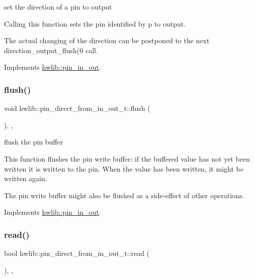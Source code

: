 set the direction of a pin to output

Calling this function sets the pin identified by p to output.

The actual changing of the direction can be postponed to the next direction\+\_\+output\+\_\+flush(0 call. 

Implements \hyperlink{classhwlib_1_1pin__in__out_ad08a5f5e9a4c3aadaa7c665b98f2418e}{hwlib\+::pin\+\_\+in\+\_\+out}.

\mbox{\label{classhwlib_1_1pin__direct__from__in__out__t_a4c67e73e0fa9ac4e9a2c5917537eb98a}} 
\subsubsection{\texorpdfstring{flush()}{flush()}}
{\footnotesize\ttfamily void hwlib\+::pin\+\_\+direct\+\_\+from\+\_\+in\+\_\+out\+\_\+t\+::flush (\begin{DoxyParamCaption}{ }\end{DoxyParamCaption})\hspace{0.3cm}{\ttfamily [inline]}, {\ttfamily [override]}, {\ttfamily [virtual]}}

flush the pin buffer

This function flushes the pin write buffer\+: if the buffered value has not yet been written it is written to the pin. When the value has been written, it might be written again.

The pin write buffer might also be flushed as a side-\/effect of other operations. 

Implements \hyperlink{classhwlib_1_1pin__in__out_a5207c9e30f0c88e4c052952397c2da88}{hwlib\+::pin\+\_\+in\+\_\+out}.

\mbox{\label{classhwlib_1_1pin__direct__from__in__out__t_a6a77a6c4d2ce69cba2873bdcd087215e}} 
\subsubsection{\texorpdfstring{read()}{read()}}
{\footnotesize\ttfamily bool hwlib\+::pin\+\_\+direct\+\_\+from\+\_\+in\+\_\+out\+\_\+t\+::read (\begin{DoxyParamCaption}{ }\end{DoxyParamCaption})\hspace{0.3cm}{\ttfamily [inline]}, {\ttfamily [override]}, {\ttfamily [virtual]}}

